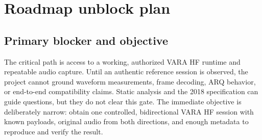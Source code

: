 \documentclass[11pt,a4paper]{article}
\begin{document}
\section{Roadmap unblock plan}

\subsection{Primary blocker and objective}
The critical path is access to a working, authorized VARA HF runtime and
repeatable audio capture. Until an authentic reference session is observed,
the project cannot ground waveform measurements, frame decoding, ARQ behavior,
or end-to-end compatibility claims. Static analysis and the 2018 specification
can guide questions, but they do not clear this gate. The immediate objective
is deliberately narrow: obtain one controlled, bidirectional VARA HF session
with known payloads, original audio from both directions, and enough metadata
to reproduce and verify the result.
\end{document}
